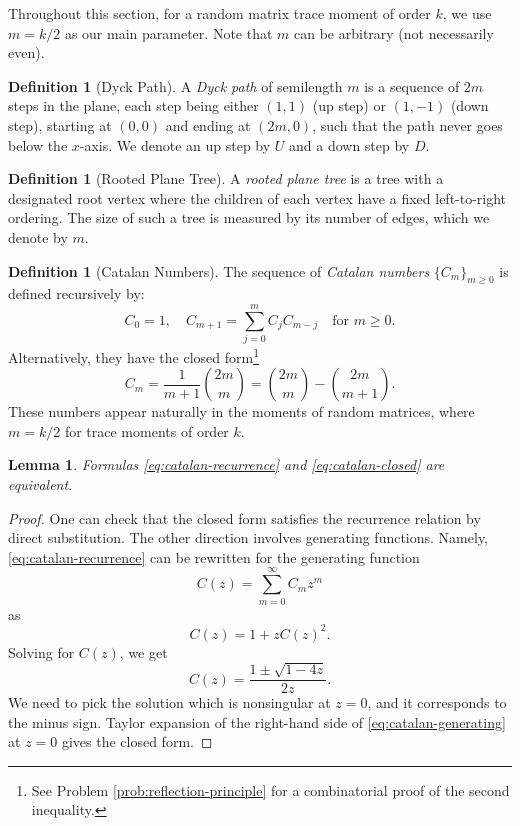 \documentclass[letterpaper,11pt,oneside,reqno]{article}
\numberwithin{equation}{section}
\newtheorem{lemma}[proposition]{Lemma}
\theoremstyle{definition}
\newtheorem{definition}[proposition]{Definition}
\begin{document}
Throughout this section, for a random matrix trace moment of order $k$,
we use $m=k/2$ as our main parameter. Note that $m$ can be arbitrary
(not necessarily even).

\begin{definition}[Dyck Path]
A \emph{Dyck path} of semilength $m$ is a sequence of $2m$ steps in the plane, each step being either $(1,1)$ (up step) or $(1,-1)$ (down step), starting at $(0,0)$ and ending at $(2m,0)$, such that the path never goes below the $x$-axis. We denote an up step by $U$ and a down step by $D$.
\end{definition}

\begin{definition}[Rooted Plane Tree]
A \emph{rooted plane tree} is a tree with a designated root vertex where the children of each vertex have a fixed left-to-right ordering. The size of such a tree is measured by its number of edges, which we denote by $m$.
\end{definition}

\begin{definition}[Catalan Numbers]
The sequence of \emph{Catalan numbers} $\{C_m\}_{m\geq 0}$ is defined recursively by:
\begin{equation}
	\label{eq:catalan-recurrence}
    C_0 = 1, \quad C_{m+1} = \sum_{j=0}^m C_j C_{m-j} \quad \text{for } m \geq 0.
\end{equation}
Alternatively, they have the closed form\footnote{See
	Problem \ref{prob:reflection-principle} for a combinatorial proof
of the second inequality.}
\begin{equation}
	\label{eq:catalan-closed}
    C_m = \frac{1}{m+1}\binom{2m}{m} =
		\binom{2m}{m} - \binom{2m}{m+1}.
\end{equation}
These numbers appear naturally in the moments of random matrices, where $m=k/2$ for trace moments of order $k$.
\end{definition}

\begin{lemma}
	\label{lemma:equivalence-catalan}
	Formulas
	\eqref{eq:catalan-recurrence} and \eqref{eq:catalan-closed} are equivalent.
\end{lemma}
\begin{proof}
	One can check that the closed form satisfies the recurrence relation by direct substitution. The other direction
	involves generating functions. Namely,
	\eqref{eq:catalan-recurrence} can be rewritten for the
	generating function
	\begin{equation*}
		C(z)=\sum_{m=0}^\infty C_m z^m
	\end{equation*}
	as
	\begin{equation*}
		C(z)=1+zC(z)^2.
	\end{equation*}
	Solving for $C(z)$, we get
	\begin{equation}
		\label{eq:catalan-generating}
		C(z)=\frac{1\pm \sqrt{1-4z}}{2z}.
	\end{equation}
	We need to pick the solution which is nonsingular at $z=0$,
	and it corresponds to the minus sign.
	Taylor expansion of the right-hand side of
	\eqref{eq:catalan-generating}
	at $z=0$
	gives the closed form.
\end{proof}
\end{document}

